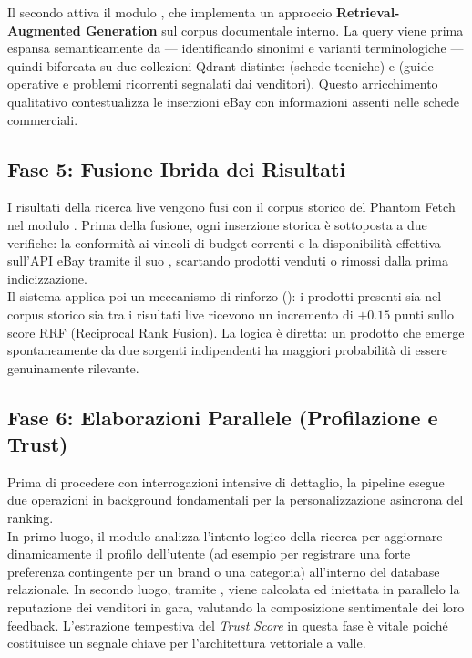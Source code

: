 \noindent
Il secondo attiva il modulo , che implementa un approccio
\textbf{Retrieval-Augmented Generation} sul corpus documentale interno.
La query viene prima espansa semanticamente da  —
identificando sinonimi e varianti terminologiche — quindi biforcata su due
collezioni Qdrant distinte:  (schede tecniche) e
 (guide operative e problemi ricorrenti segnalati dai
venditori). Questo arricchimento qualitativo contestualizza le inserzioni
eBay con informazioni assenti nelle schede commerciali.

\subsection*{Fase 5: Fusione Ibrida dei Risultati}
I risultati della ricerca live vengono fusi con il corpus storico del
Phantom Fetch nel modulo . Prima della fusione,
ogni inserzione storica è sottoposta a due verifiche: la conformità ai
vincoli di budget correnti e la disponibilità effettiva sull'API eBay
tramite il suo , scartando prodotti venduti o rimossi dalla
prima indicizzazione.\\

\noindent
Il sistema applica poi un meccanismo di rinforzo ():
i prodotti presenti sia nel corpus storico sia tra i risultati live ricevono
un incremento di \(+0.15\) punti sullo score RRF (Reciprocal Rank Fusion). La logica è diretta: un
prodotto che emerge spontaneamente da due sorgenti indipendenti ha maggiori
probabilità di essere genuinamente rilevante.

\subsection*{Fase 6: Elaborazioni Parallele (Profilazione e Trust)}
Prima di procedere con interrogazioni intensive di dettaglio, la pipeline esegue due operazioni in background fondamentali per la personalizzazione asincrona del ranking.\\

\noindent
In primo luogo, il modulo  analizza l'intento logico della ricerca per aggiornare dinamicamente il profilo dell'utente (ad esempio per registrare una forte preferenza contingente per un brand o una categoria) all'interno del database relazionale. In secondo luogo, tramite , viene calcolata ed iniettata in parallelo la reputazione dei venditori in gara, valutando la composizione sentimentale dei loro feedback. L'estrazione tempestiva del \emph{Trust Score} in questa fase è vitale poiché costituisce un segnale chiave per l'architettura vettoriale a valle.

